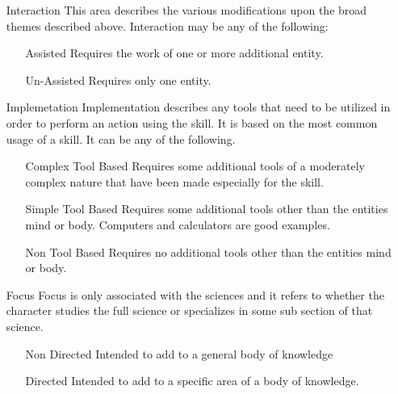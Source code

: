 \begin{itemize}
\begin{itemize}
		utilitarian object or effect.
		\item[Science]
		A series of disciplines intended to increase a codified body of
		knowledge.
		\item[Engineering]
		Any area of endeavour that attempts to apply a codified body of
		knowledge to the production of a desired physical effect.
		\item[Technical Study]
		An area of endeavour that is focused upon creating and maintaining the
		end result of the corresponding engineering discipline
		\item[Physical Discipline]
		Any area of endeavour based on muscle memory training.
		\item[Mental Discipline]
		Any area of endeavour based on purely mental manipulations without
		reference ...\footnote{How in the world do I describe this one}
		\end{itemize}
		\item[Interaction]
		This area describes the various modifications upon the broad themes
		described above. Interaction may be any of the following:
		\begin{itemize}
			\item[Assisted]
			Requires the work of one or more additional entity.
			\item[Un-Assisted]
			Requires only one entity.
		\end{itemize}
	\item[Implemetation]
	Implementation describes any tools that need to be utilized in order
	to perform an action using the skill. It is based on the most common
	usage of a skill. It can be any of the following.
	\begin{itemize}
		\item[Complex Tool Based]
		Requires some additional tools of a moderately complex nature that have been
		made especially for the skill.
		\item[Simple Tool Based]
		Requires some additional tools other than the entities mind or body.
		Computers and calculators are good examples.
		\item[Non Tool Based]
		Requires no additional tools other than the entities mind or body.
	\end{itemize}
	\item[Focus]
	Focus is only associated with the sciences and it refers to whether
	the character studies the full science or specializes in some sub
	section of that science.
	\begin{itemize}
		\item[Non Directed]
		Intended to add to a general body of knowledge
		\item[Directed]
		Intended to add to a specific area of a body of knowledge.
	\end{itemize}
\end{itemize}


